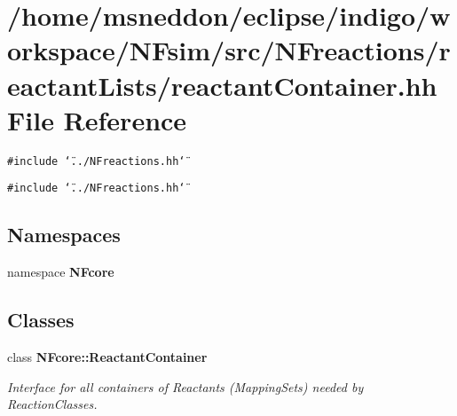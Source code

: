 \section{/home/msneddon/eclipse/indigo/workspace/NFsim/src/NFreactions/reactantLists/reactantContainer.hh File Reference}
\label{reactantContainer_8hh}


{\tt \#include \char`\"{}../NFreactions.hh\char`\"{}}\par
{\tt \#include \char`\"{}../NFreactions.hh\char`\"{}}\par
\subsection*{Namespaces}
\begin{CompactItemize}
\item 
namespace {\bf NFcore}
\end{CompactItemize}
\subsection*{Classes}
\begin{CompactItemize}
\item 
class {\bf NFcore::ReactantContainer}
\begin{CompactList}\small\item\em Interface for all containers of Reactants (MappingSets) needed by ReactionClasses. \item\end{CompactList}\end{CompactItemize}
